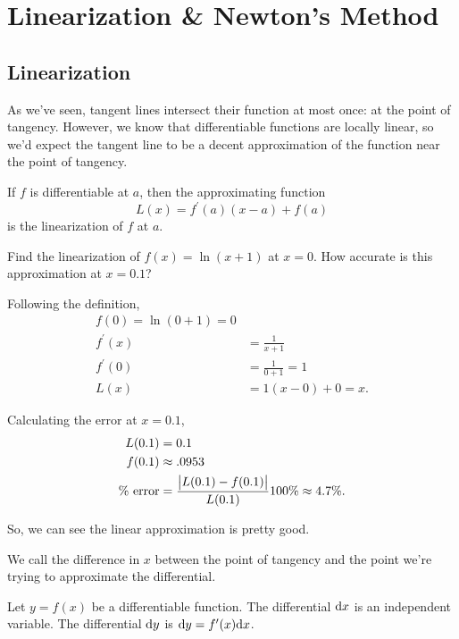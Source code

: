 \section{Linearization \& Newton's Method}

\subsection{Linearization}
As we've seen, tangent lines intersect their function at most once: at the point of tangency.
However, we know that differentiable functions are locally linear, so we'd expect the tangent line to be a decent approximation of the function near the point of tangency.

\begin{definition}
	If $f$ is differentiable at $a$, then the approximating function
	\begin{equation*}
		L(x) = f^\prime(a)(x-a) + f(a)
	\end{equation*}
	is the linearization of $f$ at $a$.
\end{definition}

\begin{example}
	Find the linearization of $f(x) = \ln{(x+1)}$ at $x=0$.
	How accurate is this approximation at $x=0.1$?
\end{example}
\begin{answer}
	Following the definition,
	\begin{align*}
		f(0) = \ln{(0+1)} = 0 \\
		f^\prime(x) &= \frac{1}{x+1} \\
		f^\prime(0) &= \frac{1}{0+1} = 1 \\
		L(x) &= 1(x-0) + 0 = x.
	\end{align*}
	
	Calculating the error at $x=0.1$,
	\begin{align*} 
		L(0.1) &= 0.1 \\
		f(0.1) &\approx .0953 \\
		\text{\% error} &= \frac{\big\lvert L(0.1)-f(0.1) \big\rvert}{L(0.1)}100\text{\%} \approx 4.7\text{\%}.
	\end{align*}
	
	So, we can see the linear approximation is pretty good.
\end{answer}


We call the difference in $x$ between the point of tangency and the point we're trying to approximate the differential.
\begin{definition}
	Let $y=f(x)$ be a differentiable function.
	The differential $\mathrm{d} x$ is an independent variable.
	The differential $\mathrm{d} y$ is $\mathrm{d} y = f^\prime(x)\mathrm{d} x$.
\end{definition}

